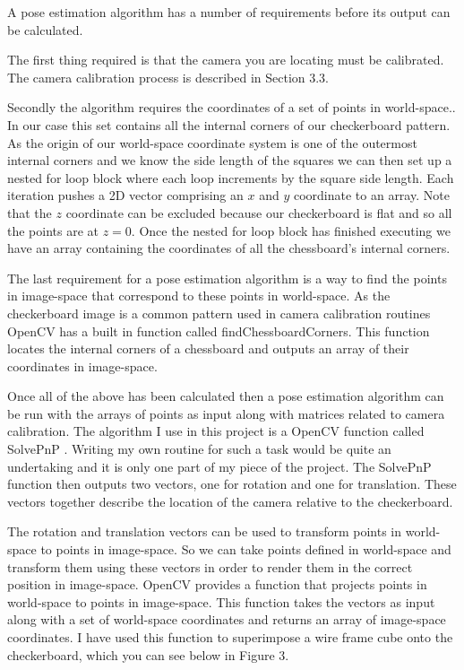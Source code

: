 \documentclass{article}
\begin{document}

A pose estimation algorithm has a number of requirements before its output can be calculated. \par

The first thing required is that the camera you are locating must be calibrated. The camera calibration process is described in Section 3.3. \par

Secondly the algorithm requires the coordinates of a set of points in world-space.. In our case this set contains all the internal corners of our checkerboard pattern. As the origin of our world-space coordinate system is one of the outermost internal corners and we know the side length of the squares we can then set up a nested for loop block where each loop increments by the square side length. Each iteration pushes a 2D vector comprising an $x$ and $y$ coordinate to an array. Note that the $z$ coordinate can be excluded because our checkerboard is flat and so all the points are at $z = 0$. Once the nested for loop block has finished executing we have an array containing the coordinates of all the chessboard's internal corners. \par

The last requirement for a pose estimation algorithm is a way to find the points in image-space that correspond to these points in world-space. As the checkerboard image is a common pattern used in camera calibration routines OpenCV has a built in function called findChessboardCorners. This function locates the internal corners of a chessboard and outputs an array of their coordinates in image-space. \par

Once all of the above has been calculated then a pose estimation algorithm can be run with the arrays of points as input along with matrices related to camera calibration. The algorithm I use in this project is a OpenCV function called SolvePnP \cite{calib3}. Writing my own routine for such a task would be quite an undertaking and it is only one part of my piece of the project. The SolvePnP function then outputs two vectors, one for rotation and one for translation. These vectors together describe the location of the camera relative to the checkerboard. \par

The rotation and translation vectors can be used to transform points in world-space to points in image-space. So we can take points defined in world-space and transform them using these vectors in order to render them in the correct position in image-space. OpenCV provides a function that projects points in world-space to points in image-space. This function takes the vectors as input along with a set of world-space coordinates and returns an array of image-space coordinates. I have used this function to superimpose a wire frame cube onto the checkerboard, which you can see below in Figure 3.
\end{document}
